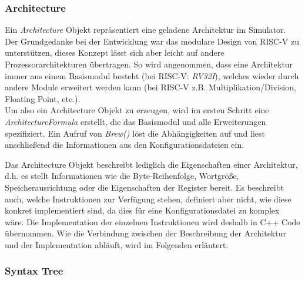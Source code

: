 \subsubsection{Architecture}


Ein \textit{Architecture} Objekt repräsentiert eine geladene Architektur im
Simulator. Der Grundgedanke bei der Entwicklung war das modulare Design von RISC-V
zu unterstützen, dieses Konzept lässt sich aber leicht auf andere Prozessorarchitekturen
übertragen. So wird angenommen, dass eine Architektur immer aus einem Basismodul
besteht (bei RISC-V: \textit{RV32I}), welches wieder durch andere Module erweitert
werden kann (bei RISC-V z.B. Multiplikation/Division, Floating Point, etc.). \\
Um also ein Architecture Objekt zu erzeugen, wird im ersten Schritt eine
\textit{ArchitectureFormula} erstellt, die das Basismodul und alle Erweiterungen
spezifiziert. Ein Aufruf von \textit{Brew()} löst die Abhängigkeiten auf und liest
anschließend die Informationen aus den Konfigurationsdateien ein.

Das Architecture Objekt beschreibt lediglich die Eigenschaften einer Architektur,
d.h. es stellt Informationen wie die Byte-Reihenfolge, Wortgröße, Speicherausrichtung
oder die Eigenschaften der Register bereit. Es beschreibt auch, welche Instruktionen
zur Verfügung stehen, definiert aber nicht, wie diese konkret implementiert sind,
da dies für eine Konfigurationsdatei zu komplex wäre. Die Implementation der
einzelnen Instruktionen wird deshalb in C++ Code übernommen. Wie die Verbindung
zwischen der Beschreibung der Architektur und der Implementation abläuft, wird
im Folgenden erläutert.

\subsubsection{Syntax Tree}


